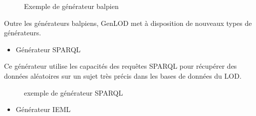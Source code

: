 \documentclass[
  a4paper,
  DIV=11,
  numbers=noendperiod]{scrreprt}
\providecommand{\tightlist}{%
  \setlength{\itemsep}{0pt}\setlength{\parskip}{0pt}}\usepackage{longtable,booktabs,array}
\begin{document}
\begin{figure}


\caption{\label{fig-GenLOGomk}Exemple de générateur balpien}

\end{figure}%

Outre les générateurs balpiens, GenLOD met à disposition de nouveaux
types de générateurs.

\begin{itemize}
\tightlist
\item
  Générateur SPARQL
\end{itemize}

Ce générateur utilise les capacités des requêtes SPARQL pour récupérer
des données aléatoires sur un sujet très précis dans les bases de
données du LOD.

\begin{figure}


\caption{\label{fig-GenLOGomkSparql}exemple de générateur SPARQL}

\end{figure}%

\begin{itemize}
\tightlist
\item
  Générateur IEML
\end{itemize}
\end{document}
